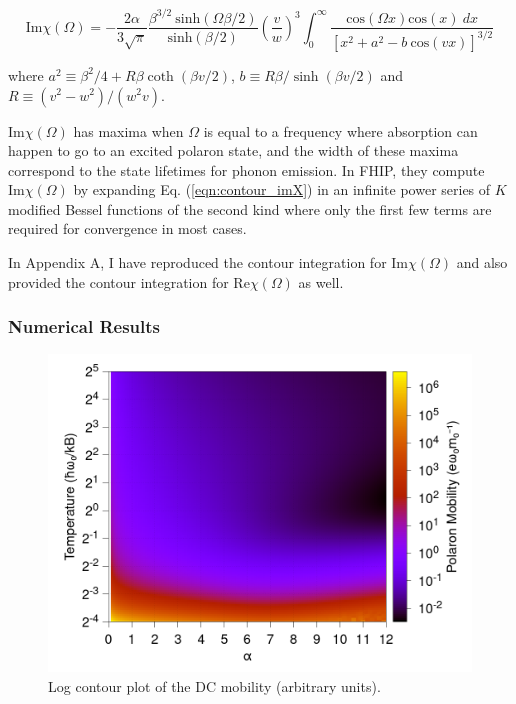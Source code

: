 \begin{equation}\label{eqn:contour_imX}
    \textrm{Im}\chi(\Omega) = - \frac{2 \alpha}{3 \sqrt{\pi}} \frac{\beta^{3/2}\ \textrm{sinh}(\Omega \beta / 2)}{\textrm{sinh}(\beta / 2)} \left( \frac{v}{w} \right)^3 \int_0^\infty \frac{\textrm{cos}(\Omega x) \textrm{cos}(x)\ dx}{\left[x^2 + a^2 - b\ \textrm{cos}(vx) \right]^{3/2}}
\end{equation}

where $a^2 \equiv \beta^2 / 4 + R \beta \coth (\beta v / 2)$, $b \equiv R\beta / \sinh(\beta v / 2)$ and $R \equiv (v^2 - w^2) / (w^2 v)$. 

$\text{Im} \chi(\Omega)$ has maxima when $\Omega$ is equal to a frequency where absorption can happen to go to an excited polaron state, and the width of these maxima correspond to the state lifetimes for phonon emission. In FHIP, they compute $\text{Im}\chi(\Omega)$ by expanding Eq. (\ref{eqn:contour_imX}) in an infinite power series of $K$ modified Bessel functions of the second kind where only the first few terms are required for convergence in most cases.  

In Appendix A, I have reproduced the contour integration for $\text{Im}\chi(\Omega)$ and also provided the contour integration for $\text{Re}\chi(\Omega)$ as well.

\subsubsection{Numerical Results}

\begin{figure}[t]
    \centering
    \includegraphics[width=.7\textwidth]{chapters/literature/figures/frohlich-3d-mobility-temp-00625to32-contourf.png}
    \caption{Log contour plot of the DC mobility (arbitrary units).}
    \label{fig:dcmobility}
\end{figure}

